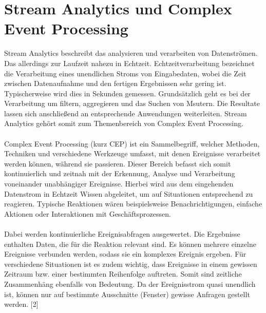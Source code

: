 \section{Stream Analytics und Complex Event Processing}
Stream Analytics beschreibt das analysieren und verarbeiten von Datenströmen. Das allerdings zur Laufzeit nahezu in Echtzeit. Echtzeitverarbeitung bezeichnet die Verarbeitung eines unendlichen Stroms von Eingabedaten, wobei die Zeit zwischen Datenaufnahme und den fertigen Ergebnissen sehr gering ist. Typischerweise wird dies in Sekunden gemessen. Grundsätzlich geht es bei der Verarbeitung um filtern, aggregieren und das Suchen von Msutern. Die Resultate lassen sich anschließend an entsprechende Anwendungen weiterleiten.  Stream Analytics gehört somit zum Themenbereich von Complex Event Processing.\\ \\ 
Complex Event Processing (kurz CEP) ist ein Sammelbegriff, welcher Methoden, Techniken und verschiedene Werkzeuge umfasst, mit denen Ereignisse verarbeitet werden können, während sie passieren. Dieser Bereich befasst sich somit kontinuierlich und zeitnah mit der Erkennung, Analyse und Verarbeitung voneinander unabhängiger Ereignisse. Hierbei wird aus dem eingehenden Datenstrom in Echtzeit Wissen abgeleitet, um auf Situationen entsprechend zu reagieren. Typische Reaktionen wären beispielsweise Benachrichtigungen, einfache Aktionen oder Interaktionen mit Geschäftsprozessen. \\ \\
Dabei werden kontinuierliche Ereignisabfragen ausgewertet. Die Ergebnisse enthalten Daten, die für die Reaktion relevant sind. Es können mehrere einzelne Ereignisse verbunden werden, sodass sie ein komplexes Ereignis ergeben. Für verschiedene Situationen ist es zudem wichtig, dass Ereignisse in einem gewissen Zeitraum bzw. einer bestimmten Reihenfolge auftreten. Somit sind zeitliche Zusammenhäng ebenfalls von Bedeutung. Da der Ereignisstrom quasi unendlich ist, können nur auf bestimmte Ausschnitte (Fenster) gewisse Anfragen gestellt werden. [2] \\ \\

